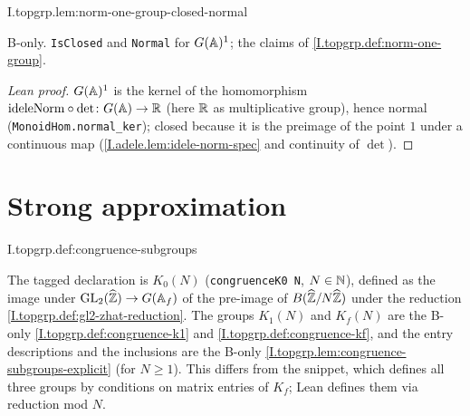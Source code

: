 \begin{lemma}
\bonly
{}
\end{lemma}
\begin{tfformal}{I.topgrp.lem:norm-one-group-closed-normal}
\begin{tffidelity}
B-only. \texttt{IsClosed} and \texttt{Normal} for $G(\mathbb{A})^1$; the claims of \cref{I.topgrp.def:norm-one-group}.
\end{tffidelity}
\end{tfformal}
\begin{proof}[Lean proof]
$G(\mathbb{A})^1$ is the kernel of the homomorphism $\mathrm{ideleNorm}\circ\det\colon G(\mathbb{A})\to\mathbb{R}$ (here $\mathbb{R}$ as multiplicative group), hence normal (\texttt{MonoidHom.normal\_ker}); closed because it is the preimage of the point $1$ under a continuous map (\cref{I.adele.lem:idele-norm-spec} and continuity of $\det$).
\end{proof}

\section{Strong approximation}

\begin{definition}
\end{definition}
\begin{tfformal}{I.topgrp.def:congruence-subgroups}
\begin{tffidelity}
The tagged declaration is $K_0(N)$ (\texttt{congruenceK0 N}, $N\in\mathbb{N}$), defined as the image under $\mathrm{GL}_2(\widehat{\mathbb{Z}})\to G(\mathbb{A}_f)$ of the pre-image of $B(\widehat{\mathbb{Z}}/N\widehat{\mathbb{Z}})$ under the reduction \cref{I.topgrp.def:gl2-zhat-reduction}. The groups $K_1(N)$ and $K_f(N)$ are the B-only \cref{I.topgrp.def:congruence-k1} and \cref{I.topgrp.def:congruence-kf}, and the entry descriptions and the inclusions are the B-only \cref{I.topgrp.lem:congruence-subgroups-explicit} (for $N\ge1$). This differs from the snippet, which defines all three groups by conditions on matrix entries of $K_f$; Lean defines them via reduction mod $N$.
\end{tffidelity}
\end{tfformal}


